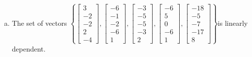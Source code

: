 \begin{exerciseAnswer}
\begin{enumerate}[(a)]
\item  The set of vectors \( \left\{ \left[\begin{array}{c}
3 \\
-2 \\
-2 \\
2 \\
-4
\end{array}\right] , \left[\begin{array}{c}
-6 \\
-1 \\
-2 \\
-6 \\
1
\end{array}\right] , \left[\begin{array}{c}
-3 \\
-5 \\
-5 \\
-3 \\
2
\end{array}\right] , \left[\begin{array}{c}
-6 \\
5 \\
0 \\
-6 \\
1
\end{array}\right] , \left[\begin{array}{c}
-18 \\
-5 \\
-7 \\
-17 \\
8
\end{array}\right] \right\} \)is linearly dependent.
\end{enumerate}
    
\end{exerciseAnswer}
    
